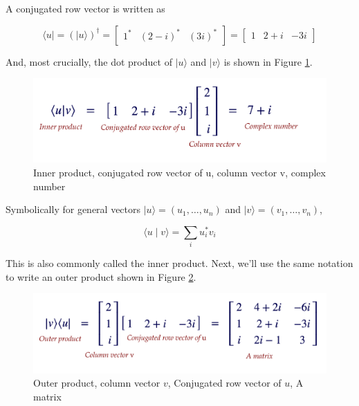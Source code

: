 \documentclass[main.tex]{subfiles}
\begin{document}
    A conjugated row vector is written as 
    
    $$
    \langle u|=(|u\rangle)^{\dagger}=\left[\begin{array}{ccc}
    1^{*} & (2-i)^{*} & (3 i)^{*}
    \end{array}\right]=\left[\begin{array}{lll}
    1 & 2+i & -3 i
    \end{array}\right]
    $$
    
    And, most crucially, the dot product of $|u\rangle$ and $|v\rangle$ is shown in Figure \ref{fig:05dirac2}.
    
    \begin{figure}
        \centering
        \includegraphics[width=5in]{notes/figs/n04/05dirac2.png}
        \caption{Inner product, conjugated row vector of u, column vector v, complex number}
        \label{fig:05dirac2}
    \end{figure}
    
    Symbolically for general vectors $|u\rangle=\left(u_{1}, \ldots, u_{n}\right)$ and $|v\rangle=\left(v_{1}, \ldots, v_{n}\right)$,
    
    $$
    \langle u \mid v\rangle=\sum_{i} u_{i}^{*} v_{i}
    $$
    
    This is also commonly called the inner product. Next, we'll use the same notation to write an outer product shown in Figure \ref{fig:06dirac3}.
    
    \begin{figure}
        \centering
        \includegraphics[width=5in]{notes/figs/n04/06dirac3.png}
        \caption{Outer product, column vector $v$, Conjugated row vector of $u$, A matrix}
        \label{fig:06dirac3}
    \end{figure}
    
\end{document}
